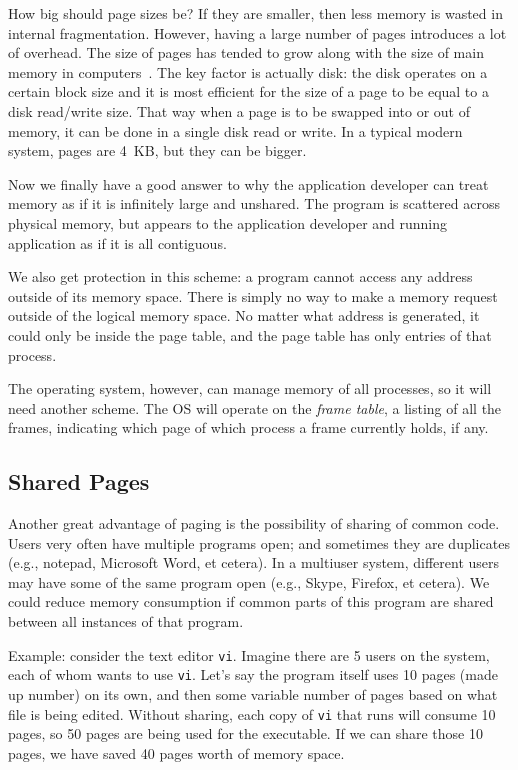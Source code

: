 How big should page sizes be? If they are smaller, then less memory is wasted in internal fragmentation. However, having a large number of pages introduces a lot of overhead. The size of pages has tended to grow along with the size of main memory in computers~\cite{osc}. The key factor is actually disk: the disk operates on a certain block size and it is most efficient for the size of a page to be equal to a disk read/write size. That way when a page is to be swapped into or out of memory, it can be done in a single disk read or write. In a typical modern system, pages are 4~KB, but they can be bigger.

Now we finally have a good answer to why the application developer can treat memory as if it is infinitely large and unshared. The program is scattered across physical memory, but appears to the application developer and running application as if it is all contiguous. 

We also get protection in this scheme: a program cannot access any address outside of its memory space. There is simply no way to make a memory request outside of the logical memory space. No matter what address is generated, it could only be inside the page table, and the page table has only entries of that process.

The operating system, however, can manage memory of all processes, so it will need another scheme. The OS will operate on the \textit{frame table}, a listing of all the frames, indicating which page of which process a frame currently holds, if any.

\subsection*{Shared Pages}

Another great advantage of paging is the possibility of sharing of common code. Users very often have multiple programs open; and sometimes they are duplicates (e.g., notepad, Microsoft Word, et cetera). In a multiuser system, different users may have some of the same program open (e.g., Skype, Firefox, et cetera). We could reduce memory consumption if common parts of this program are shared between all instances of that program.

Example: consider the text editor \texttt{vi}. Imagine there are 5 users on the system, each of whom wants to use \texttt{vi}. Let's say the program itself uses 10 pages (made up number) on its own, and then some variable number of pages based on what file is being edited. Without sharing, each copy of \texttt{vi} that runs will consume 10 pages, so 50 pages are being used for the executable. If we can share those 10 pages, we have saved 40 pages worth of memory space.


